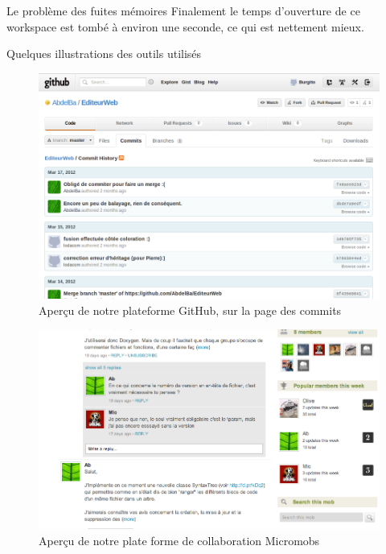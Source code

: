 \documentclass[a4paper, 12pt]{report}
\begin{document}
\begin{chapter}
\begin{section}{Le problème des fuites mémoires}
		Finalement le temps d'ouverture de ce workspace est tombé à environ une seconde, ce qui est nettement mieux.
	\end{section}
	\newpage
	\begin{section}{Quelques illustrations des outils utilisés}
		\begin{figure}[ht]
			\begin{center}
			\includegraphics[width=17cm]{images/GitHub.png}
			\caption{Aperçu de notre plateforme GitHub, sur la page des commits}
			\label{commit}
			\end{center}
		\end{figure}	
		\begin{figure}[ht]
			\begin{center}
			\includegraphics[width=17cm]{images/Micromobs.png}
			\caption{Aperçu de notre plate forme de collaboration Micromobs}
			\label{mmobs}
			\end{center}
		\end{figure}
	\end{section}
	\end{chapter}
\end{document}
